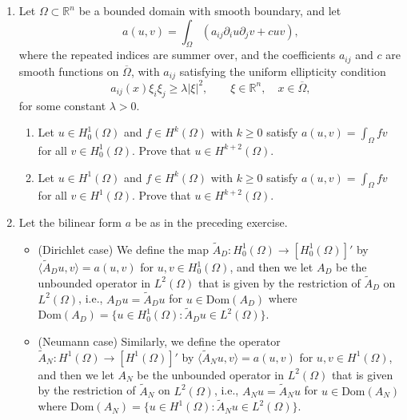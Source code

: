 \documentclass[11pt,reqno]{amsart}
\newcommand{\R}{\mathbb{R}}
\newcommand{\loc}{\mathrm{loc}}
\begin{document}
\begin{enumerate}[1.]
\begin{enumerate}[(a)]
Prove that for any $0<r<R<\infty$ there exists a constant $C$ such that
$$
\|Tf\|_{C^{0,\alpha}(B_r)} \leq C \|f\|_{C^{0,\alpha}(B_R)},
\qquad f\in C^{0,\alpha}(B_R).
$$
\item
Let $\Omega\subset\R^n$ be an open set and let
$u\in H^1_\loc(\Omega)$ be a weak solution of $\Delta u=f$ in $\Omega$, with $f\in C^{0,\alpha}(\Omega)$.
Show that $u\in C^{2,\alpha}(K)$ for any compact $K\subset\Omega$.
\end{enumerate}
\item
Let $\Omega\subset\R^n$ be a bounded domain with smooth boundary, and let
$$
a(u,v) = \int_\Omega ( a_{ij}\partial_iu\partial_jv + cuv),
$$
where the repeated indices are summer over, and the coefficients $a_{ij}$ and $c$ are smooth functions on $\overline{\Omega}$,
with $a_{ij}$ satisfying the uniform ellipticity condition
$$
a_{ij}(x)\xi_i\xi_j\geq\lambda |\xi|^2,
\qquad \xi\in\R^n,
\quad x\in\overline\Omega,
$$
for some constant $\lambda>0$.
\begin{enumerate}
\item
Let $u\in H^1_0(\Omega)$ and $f\in H^k(\Omega)$ with $k\geq0$ satisfy
$a(u,v)=\int_\Omega fv$
for all $v\in H^1_0(\Omega)$.
Prove that $u\in H^{k+2}(\Omega)$.
\item
Let $u\in H^1(\Omega)$ and $f\in H^k(\Omega)$ with $k\geq0$ satisfy
$a(u,v)=\int_\Omega fv$
for all $v\in H^1(\Omega)$.
Prove that $u\in H^{k+2}(\Omega)$.
\end{enumerate}
\item
Let the bilinear form $a$ be as in the preceding exercise.
\begin{itemize}
\item(Dirichlet case)
We define the map $\tilde A_{D}:H^1_0(\Omega)\to[H^1_0(\Omega)]'$ by
$\langle \tilde A_{D}u,v\rangle=a(u,v)$ for $u,v\in H^1_0(\Omega)$,
and then we let $A_D$ be the unbounded operator in $L^2(\Omega)$ that is given by the restriction of $\tilde A_D$ on $L^2(\Omega)$,
i.e., $A_Du=\tilde A_Du$ for $u\in \mathrm{Dom}(A_D)$ where $\mathrm{Dom}(A_D) = \{u\in H^1_0(\Omega):\tilde A_Du\in L^2(\Omega)\}$.
\item(Neumann case)
Similarly, we define the operator $\tilde A_{N}:H^1(\Omega)\to[H^1(\Omega)]'$ by
$\langle \tilde A_{N}u,v\rangle=a(u,v)$ for $u,v\in H^1(\Omega)$,
and then we let $A_N$ be the unbounded operator in $L^2(\Omega)$ that is given by the restriction of $\tilde A_N$ on $L^2(\Omega)$,
i.e., $A_Nu=\tilde A_Nu$ for $u\in \mathrm{Dom}(A_N)$ where $\mathrm{Dom}(A_N) = \{u\in H^1(\Omega):\tilde A_Nu\in L^2(\Omega)\}$.

\end{itemize}
\end{enumerate}
\end{document}
